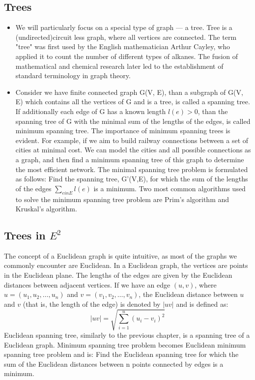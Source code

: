 \documentclass[12pt]{article}
\begin{document}
	\subsection{Trees}
	\begin{itemize} 
		\item We will particularly focus on a special type of graph — a tree.
		Tree is a (undirected)circuit less graph, where all vertices are connected.
		The term "tree" was first used by the English mathematician Arthur Cayley, who applied it to count the number of different types of alkanes. The fusion of mathematical and chemical research later led to the establishment of standard terminology in graph theory.
		
		\item Consider we have finite connected graph G(V, E), than a subgraph of G(V, E) which contains all the vertices of G and is a tree, is called a spanning tree. If additionally each edge of G has a known length \(l(e)>0\), than the spanning tree of G with the minimal sum of the lengths of the edges, is called minimum spanning tree. The importance of minimum spanning trees is evident. For example, if we aim to build railway connections between a set of cities at minimal cost. We can model the cities and all possible connections as a graph, and then find a minimum spanning tree of this graph to determine the most efficient network. 
		The minimal spanning tree problem is formulated as follows: Find the spanning tree, G'(V,E), for which the sum of the lengths of the edges \( \sum_{ein E} l(e)\) is a minimum. Two most common algorithms used to solve the minimum spanning tree problem are Prim's algorithm and Kruskal's algorithm.
	\end{itemize}		

	\subsection{Trees in \(E^2\)}
		The concept of a Euclidean graph is quite intuitive, as most of the graphs we commonly encounter are Euclidean. In a Euclidean graph, the vertices are points in the Euclidean plane. The lengths of the edges are given by the Euclidean distances between adjacent vertices. If we have an edge \( (u, v) \), where \( u = (u_1, u_2, \dots, u_n) \) and \( v = (v_1, v_2, \dots, v_n) \), the Euclidean distance between \( u \) and \( v \) (that is, the length of the edge) is denoted by \( |uv| \) and is defined as:
		\[
		|uv| = \sqrt{ \sum_{i=1}^{n} (u_i - v_i)^2 }
		\]
		Euclidean spanning tree, similarly to the previous chapter, is a spanning tree of a Euclidean graph. Minimum spanning tree problem becomes Euclidean minimum spanning tree problem and is: Find the Euclidean spanning tree for which the sum of the Euclidean distances between n points connected by edges is a minimum. 
\end{document}
